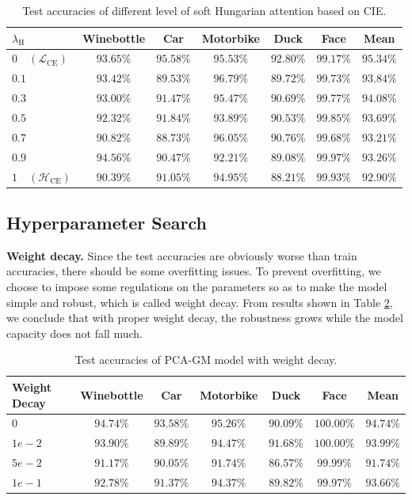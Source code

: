 \documentclass[a4paper]{article}
\begin{document}
\begin{table}[htbp]
    \centering
    \begin{tabular}{lcccccc}
        \toprule
        $\lambda_{\mathrm{H}}$& Winebottle& Car& Motorbike& Duck& Face& Mean\\
        \midrule
        $0\quad (\mathcal{L}_{\mathrm{CE}})$&$93.65\%$& $\mathbf{95.58\%}$& $95.53\%$& $\mathbf{92.80\%}$& $99.17\%$& $\mathbf{95.34\%}$\\
        $0.1$& $93.42\%$& $89.53\%$& $96.79\%$& $89.72\%$& $99.73\%$& $93.84\%$\\
        $0.3$& $93.00\%$& $91.47\%$& $95.47\%$& $90.69\%$& $99.77\%$& $94.08\%$\\
        $0.5$& $92.32\%$& $91.84\%$& $93.89\%$& $90.53\%$& $99.85\%$& $93.69\%$\\
        $0.7$& $90.82\%$& $88.73\%$& $\mathbf{96.05\%}$& $90.76\%$& $99.68\%$& $93.21\%$\\
        $0.9$& $\mathbf{94.56\%}$& $90.47\%$& $92.21\%$& $89.08\%$& $\mathbf{99.97\%}$& $93.26\%$\\
        $1\quad (\mathcal{H}_{\mathrm{CE}})$& $90.39\%$& $91.05\%$& $94.95\%$& $88.21\%$& $99.93\%$& $92.90\%$\\
        \bottomrule
        
    \end{tabular}
    \caption{Test accuracies of different level of soft Hungarian attention based on CIE.}
    \label{tab:hungarian}
\end{table}

\subsection{Hyperparameter Search}
\textbf{Weight decay.}
Since the test accuracies are obviously worse than train accuracies, there should be some overfitting issues. To prevent overfitting, we choose to impose some regulations on the parameters so as to make the model simple and robust, which is called weight decay. From results shown in Table \ref{tab:weightdecay}, we conclude that with proper weight decay, the robustness grows while the model capacity does not fall much.

\begin{table}[htbp]
    \centering
    \begin{tabular}{lcccccc}
        \toprule
        Weight Decay& Winebottle& Car& Motorbike& Duck& Face& Mean\\
        \midrule
        $0$&$94.74\%$& $93.58\%$& $95.26\%$& $90.09\%$& $100.00\%$& $94.74\%$\\
        $1e-2$& $93.90\%$& $89.89\%$& $94.47\%$& $91.68\%$& $100.00\%$& $93.99\%$\\
        $5e-2$& $91.17\%$& $90.05\%$& $91.74\%$& $86.57\%$& $99.99\%$& $91.74\%$\\
        $1e-1$& $92.78\%$& $91.37\%$& $94.37\%$& $89.82\%$& $99.97\%$& $93.66\%$\\
        \bottomrule
        
    \end{tabular}
    \caption{Test accuracies of PCA-GM model with weight decay.}
    \label{tab:weightdecay}
\end{table}
\end{document}
